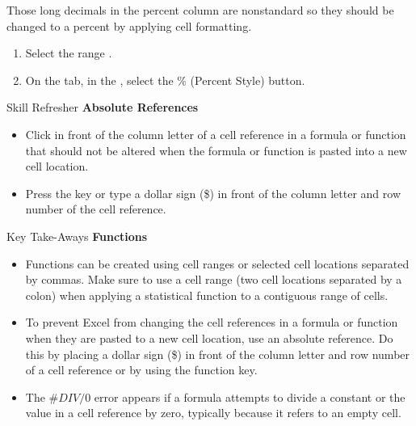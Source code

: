 Those long decimals in the percent column are nonstandard so they should be changed to a percent by applying cell formatting.

\begin{enumerate}
	\item Select the range .
	\item On the  tab, in the , select the \% (Percent Style) button.
\end{enumerate}

\begin{center}
	\begin{sklbox}{Skill Refresher}
		\textbf{Absolute References}
		\\
		\begin{itemize}
			\setlength{\itemsep}{0pt}
			\setlength{\parskip}{0pt}
			\setlength{\parsep}{0pt}

			\item Click in front of the column letter of a cell reference in a formula or function that should not be altered when the formula or function is pasted into a new cell location.
			\item Press the  key or type a dollar sign (\$) in front of the column letter and row number of the cell reference.
						
		\end{itemize}
	\end{sklbox}
\end{center}

\begin{center}
	\begin{tkwbox}{Key Take-Aways}
		\textbf{Functions}
		\\
		\begin{itemize}
			\setlength{\itemsep}{0pt}
			\setlength{\parskip}{0pt}
			\setlength{\parsep}{0pt}

			\item Functions can be created using cell ranges or selected cell locations separated by commas. Make sure to use a cell range (two cell locations separated by a colon) when applying a statistical function to a contiguous range of cells.
			\item To prevent Excel from changing the cell references in a formula or function when they are pasted to a new cell location, use an absolute reference. Do this by placing a dollar sign (\$) in front of the column letter and row number of a cell reference or by using the  function key.
			\item The $ \#DIV/0 $ error appears if a formula attempts to divide a constant or the value in a cell reference by zero, typically because it refers to an empty cell.
			
		\end{itemize}
	\end{tkwbox}
\end{center}

